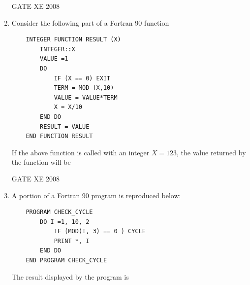 \documentclass[12pt]{article}
\begin{document}
\begin{enumerate}[label=Q\arabic*.]
\begin{enumerate}[label=(\Alph*)]
\end{enumerate}

GATE XE 2008

\item Consider the following part of a Fortran 90 function \begin{verbatim}
    INTEGER FUNCTION RESULT (X)
        INTEGER::X
        VALUE =1
        DO
            IF (X == 0) EXIT
            TERM = MOD (X,10)
            VALUE = VALUE*TERM
            X = X/10
        END DO
        RESULT = VALUE
    END FUNCTION RESULT
\end{verbatim}
If the above function is called with an integer $X=123$, the value returned by the function will be

\begin{enumerate}[label=(\Alph*)]
\end{enumerate}

GATE XE 2008
\item  A portion of a Fortran 90 program is reproduced below:
\begin{verbatim}
    PROGRAM CHECK_CYCLE
        DO I =1, 10, 2
            IF (MOD(I, 3) == 0 ) CYCLE
            PRINT *, I
        END DO
    END PROGRAM CHECK_CYCLE
\end{verbatim}
The result displayed by the program is


\end{enumerate}
\end{document}

